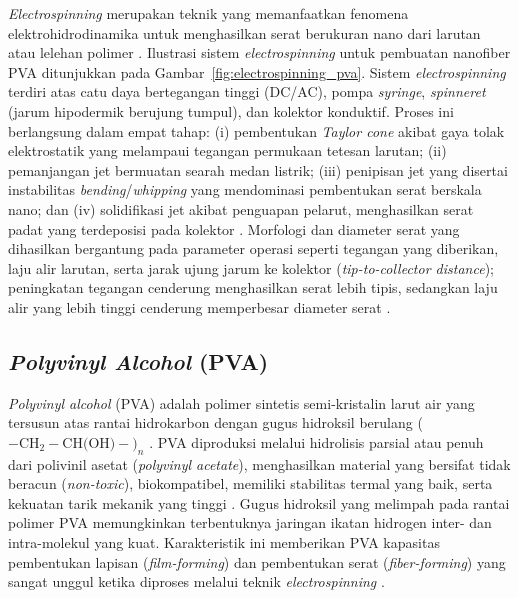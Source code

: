\textit{Electrospinning} merupakan teknik yang memanfaatkan fenomena elektrohidrodinamika untuk menghasilkan serat berukuran nano dari larutan atau lelehan polimer \cite{xue2019electrospinning}. Ilustrasi sistem \textit{electrospinning} untuk pembuatan nanofiber PVA ditunjukkan pada Gambar~\ref{fig:electrospinning_pva}. Sistem \textit{electrospinning} terdiri atas catu daya bertegangan tinggi (DC/AC), pompa \textit{syringe}, \textit{spinneret} (jarum hipodermik berujung tumpul), dan kolektor konduktif. Proses ini berlangsung dalam empat tahap: (i) pembentukan \textit{Taylor cone} akibat gaya tolak elektrostatik yang melampaui tegangan permukaan tetesan larutan; (ii) pemanjangan jet bermuatan searah medan listrik; (iii) penipisan jet yang disertai instabilitas \textit{bending}/\textit{whipping} yang mendominasi pembentukan serat berskala nano; dan (iv) solidifikasi jet akibat penguapan pelarut, menghasilkan serat padat yang terdeposisi pada kolektor \cite{xue2019electrospinning}. Morfologi dan diameter serat yang dihasilkan bergantung pada parameter operasi seperti tegangan yang diberikan, laju alir larutan, serta jarak ujung jarum ke kolektor (\textit{tip-to-collector distance}); peningkatan tegangan cenderung menghasilkan serat lebih tipis, sedangkan laju alir yang lebih tinggi cenderung memperbesar diameter serat \cite{xue2019electrospinning}.

\subsection{\textit{Polyvinyl Alcohol} (PVA)}
\textit{Polyvinyl alcohol} (PVA) adalah polimer sintetis semi-kristalin larut air yang tersusun atas rantai hidrokarbon dengan gugus hidroksil berulang ($-\text{CH}_2-\text{CH(OH)}-)_n$ \cite{gaaz2015properties}. PVA diproduksi melalui hidrolisis parsial atau penuh dari polivinil asetat (\textit{polyvinyl acetate}), menghasilkan material yang bersifat tidak beracun (\textit{non-toxic}), biokompatibel, memiliki stabilitas termal yang baik, serta kekuatan tarik mekanik yang tinggi \cite{Turkoglu2024,gaaz2015properties}. Gugus hidroksil yang melimpah pada rantai polimer PVA memungkinkan terbentuknya jaringan ikatan hidrogen inter- dan intra-molekul yang kuat. Karakteristik ini memberikan PVA kapasitas pembentukan lapisan (\textit{film-forming}) dan pembentukan serat (\textit{fiber-forming}) yang sangat unggul ketika diproses melalui teknik \textit{electrospinning} \cite{xue2019electrospinning}.

